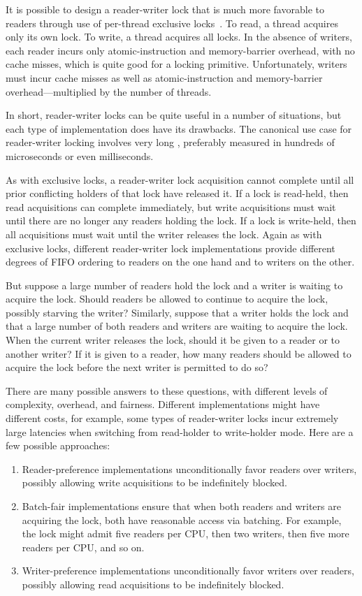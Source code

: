 It is possible to design a reader-writer lock that is much more
favorable to readers through use of per-thread exclusive
locks~\cite{WilsonCHsieh92a}.
To read, a thread acquires only its own lock.
To write, a thread acquires all locks.
In the absence of writers, each reader incurs only atomic-instruction
and memory-barrier overhead, with no cache misses, which is quite
good for a locking primitive.
Unfortunately, writers must incur cache misses as well as atomic-instruction
and memory-barrier overhead---multiplied by the number of threads.

In short, reader-writer locks can be quite useful in a number of
situations, but each type of implementation does have its drawbacks.
The canonical use case for reader-writer locking involves very long
, preferably measured in hundreds of microseconds
or even milliseconds.

As with exclusive locks, a reader-writer lock acquisition cannot complete
until all prior conflicting holders of that lock have released it.
If a lock is read-held, then read acquisitions can complete immediately,
but write acquisitions must wait until there are no longer any readers
holding the lock.
If a lock is write-held, then all acquisitions must wait until the writer
releases the lock.
Again as with exclusive locks, different reader-writer lock implementations
provide different degrees of FIFO ordering to readers on the one hand
and to writers on the other.

But suppose a large number of readers hold the lock and a writer is waiting
to acquire the lock.
Should readers be allowed to continue to acquire the lock, possibly
starving the writer?
Similarly, suppose that a writer holds the lock and that a large number
of both readers and writers are waiting to acquire the lock.
When the current writer releases the lock, should it be given to a reader
or to another writer?
If it is given to a reader, how many readers should be allowed to acquire
the lock before the next writer is permitted to do so?

There are many possible answers to these questions, with different
levels of complexity, overhead, and fairness.
Different implementations might have different costs, for example,
some types of reader-writer locks incur extremely large latencies
when switching from read-holder to write-holder mode.
Here are a few possible approaches:

\begin{enumerate}
\item
	Reader-preference implementations unconditionally favor readers
	over writers, possibly allowing write acquisitions to be
	indefinitely blocked.
\item	Batch-fair implementations ensure that when both readers and writers
	are acquiring the lock, both have reasonable access via batching.
	For example, the lock might admit five readers per CPU, then two
	writers, then five more readers per CPU, and so on.
\item	Writer-preference implementations unconditionally favor
	writers over readers, possibly allowing read acquisitions to be
	indefinitely blocked.
\end{enumerate}

